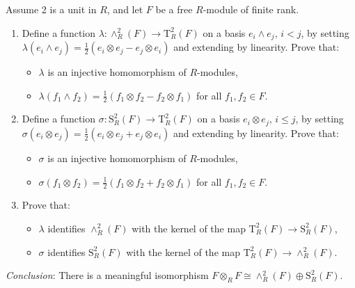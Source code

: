 \documentclass[openany]{book}
\newcommand{\tensor}{\otimes} %
\newcommand{\lambdaprod}{\wedge} %
\newcommand{\T}{\text{T}} %
\newcommand{\Ssq}{\text{S}}
\begin{document}
    \begin{prob}[4.9]
    Assume 2 is a unit in \( R \), and let \( F \) be a free \( R \)-module of finite rank.
    \begin{enumerate}
        \item Define a function \( \lambda : \lambdaprod^2_R(F) \rightarrow \T^2_R(F) \) on a basis \( e_i \lambdaprod e_j, \, i < j \), by setting \( \lambda(e_i \lambdaprod e_j) = \frac{1}{2}(e_i \tensor e_j - e_j \tensor e_i) \) and extending by linearity. Prove that:
        \begin{itemize}
            \item \( \lambda \) is an injective homomorphism of \( R \)-modules,
            \item \( \lambda(f_1 \lambdaprod f_2) = \frac{1}{2}(f_1 \tensor f_2 - f_2 \tensor f_1) \) for all \( f_1, f_2 \in F \).
        \end{itemize}
        
        \item Define a function \( \sigma : \Ssq^2_R(F) \rightarrow \T^2_R(F) \) on a basis \( e_i \tensor e_j, \, i \leq j \), by setting \( \sigma(e_i \tensor e_j) = \frac{1}{2}(e_i \tensor e_j + e_j \tensor e_i) \) and extending by linearity. Prove that:
        \begin{itemize}
            \item \( \sigma \) is an injective homomorphism of \( R \)-modules,
            \item \( \sigma(f_1 \tensor f_2) = \frac{1}{2}(f_1 \tensor f_2 + f_2 \tensor f_1) \) for all \( f_1, f_2 \in F \).
        \end{itemize}
        
        \item Prove that:
        \begin{itemize}
            \item \( \lambda \) identifies \( \lambdaprod^2_R(F) \) with the kernel of the map \( \T^2_R(F) \rightarrow \Ssq^2_R(F) \),
            \item \( \sigma \) identifies \( \Ssq^2_R(F) \) with the kernel of the map \( \T^2_R(F) \rightarrow \lambdaprod^2_R(F) \).
        \end{itemize}
    \end{enumerate}
    \textit{Conclusion}: There is a meaningful isomorphism \( F \tensor_R F \cong \lambdaprod^2_R(F) \oplus \Ssq^2_R(F) \).
    \end{prob}
\end{document}
